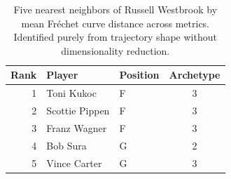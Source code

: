 \begin{table}[htbp]
  \centering\small
  \begin{tabular}{rllc}
    \toprule
    Rank & Player & Position & Archetype \\
    \midrule
    1 & Toni Kukoc & F & 3 \\
    2 & Scottie Pippen & F & 3 \\
    3 & Franz Wagner & F & 3 \\
    4 & Bob Sura & G & 2 \\
    5 & Vince Carter & G & 3 \\
    \bottomrule
  \end{tabular}
  \caption{Five nearest neighbors of Russell Westbrook by mean Fr\'{e}chet curve distance across metrics. Identified purely from trajectory shape without dimensionality reduction.}
  \label{tab:Russell_Westbrook_frechet_curve_neighbors}
\end{table}

